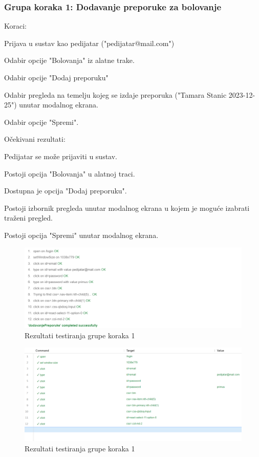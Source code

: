 			 \subsubsection*{Grupa koraka 1: Dodavanje preporuke za bolovanje}
			 Koraci:
			 \begin{packed_enum}
				\item Prijava u sustav kao pedijatar ("pedijatar@mail.com")
				\item Odabir opcije "Bolovanja" iz alatne trake.
				\item Odabir opcije "Dodaj preporuku"
				\item Odabir pregleda na temelju kojeg se izdaje preporuka ("Tamara Stanic 2023-12-25") unutar modalnog ekrana.
				\item Odabir opcije "Spremi".
			 \end{packed_enum}
			 Očekivani rezultati:
			 \begin{packed_enum}
				\item Pedijatar se može prijaviti u sustav.
				\item Postoji opcija "Bolovanja" u alatnoj traci.
				\item Dostupna je opcija "Dodaj preporuku".
				\item Postoji izbornik pregleda unutar modalnog ekrana u kojem je moguće izabrati traženi pregled.
				\item Postoji opcija "Spremi" unutar modalnog ekrana.
			 \end{packed_enum}
			 
			 \begin{figure}[H]
				\includegraphics[width=\textwidth]{slike/selenium1.1.png} 
				\caption{Rezultati testiranja grupe koraka 1} 
			\end{figure}

			\begin{figure}[H]
				\includegraphics[width=\textwidth]{slike/selenium1.2.png} 
				\caption{Rezultati testiranja grupe koraka 1} 
			\end{figure}


